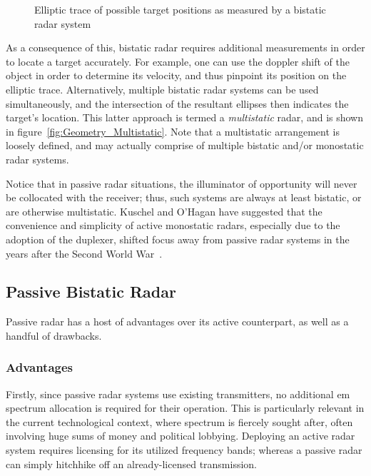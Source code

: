 \documentclass[class=report,11pt,crop=false]{standalone}
\begin{document}
\begin{figure}
    \centering
    \def\svgwidth{0.7\linewidth}
    { %
        }
    \caption{Elliptic trace of possible target positions as measured by a bistatic radar system}
    \label{fig:Elliptic_Curve}
\end{figure}

As a consequence of this, bistatic radar requires additional measurements in order to locate a target accurately. For example, one can use the doppler shift of the object in order to determine its velocity, and thus pinpoint its position on the elliptic trace. Alternatively, multiple bistatic radar systems can be used simultaneously, and the intersection of the resultant ellipses then indicates the target's location. This latter approach is termed a \emph{multistatic} radar, and is shown in figure~\ref{fig:Geometry_Multistatic}. Note that a multistatic arrangement is loosely defined, and may actually comprise of multiple bistatic and/or monostatic radar systems.

Notice that in passive radar situations, the illuminator of opportunity will never be collocated with the receiver; thus, such systems are always at least bistatic, or are otherwise multistatic. Kuschel and O'Hagan have suggested that the convenience and simplicity of active monostatic radars, especially due to the adoption of the duplexer, shifted focus away from passive radar systems in the years after the Second World War~\cite{kuschel-hagan-history}.

\subsection{Passive Bistatic Radar}

Passive radar has a host of advantages over its active counterpart, as well as a handful of drawbacks.

\subsubsection{Advantages}
Firstly, since passive radar systems use existing transmitters, no additional \gls{em} spectrum allocation is required for their operation. This is particularly relevant in the current technological context, where spectrum is fiercely sought after, often involving huge sums of money and political lobbying. Deploying an active radar system requires licensing for its utilized frequency bands; whereas a passive radar can simply hitchhike off an already-licensed transmission.
\end{document}
